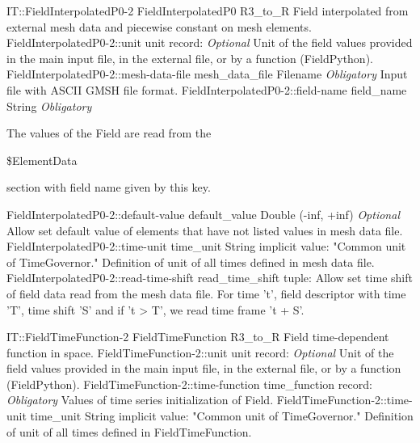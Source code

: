 \begin{RecordType}
	{IT::FieldInterpolatedP0-2}
	{FieldInterpolatedP0}
	{}%
	{}%
	{{{R3{\_}to{\_}R Field interpolated from external mesh data and piecewise constant on mesh elements.}%
}}
		\RecKey
			{FieldInterpolatedP0-2::unit}
			{unit}
			{{record: }}{}
			{ \it{Optional}}
			{{{Unit of the field values provided in the main input file, in the external file, or by a function (FieldPython).}%
}}
		\RecKey
			{FieldInterpolatedP0-2::mesh-data-file}
			{mesh{\_}data{\_}file}
			{{Filename}}{}
			{ \it{Obligatory}}
			{{{Input file with ASCII GMSH file format.}%
}}
		\RecKey
			{FieldInterpolatedP0-2::field-name}
			{field{\_}name}
			{{String}}{}
			{ \it{Obligatory}}
			{{{The values of the Field are read from the }\begin{ttfamily}{\$}ElementData\end{ttfamily}{ section with field name given by this key.}%
}}
		\RecKey
			{FieldInterpolatedP0-2::default-value}
			{default{\_}value}
			{{Double (-inf, +inf)}}{}
			{ \it{Optional}}
			{{{Allow set default value of elements that have not listed values in mesh data file.}%
}}
		\RecKey
			{FieldInterpolatedP0-2::time-unit}
			{time{\_}unit}
			{{String}}{}
			{implicit value: "{Common unit of TimeGovernor.}"}
			{{{Definition of unit of all times defined in mesh data file.}%
}}
		\RecKey
			{FieldInterpolatedP0-2::read-time-shift}
			{read{\_}time{\_}shift}
			{{tuple: }}{}
			{ }
			{{{Allow set time shift of field data read from the mesh data file.
For time 't', field descriptor with time 'T', time shift 'S' and if 't {\textgreater} T', we read time frame 't + S'.}%
}}
\end{RecordType}
\begin{RecordType}
	{IT::FieldTimeFunction-2}
	{FieldTimeFunction}
	{}%
	{}%
	{{{R3{\_}to{\_}R Field time-dependent function in space.}%
}}
		\RecKey
			{FieldTimeFunction-2::unit}
			{unit}
			{{record: }}{}
			{ \it{Optional}}
			{{{Unit of the field values provided in the main input file, in the external file, or by a function (FieldPython).}%
}}
		\RecKey
			{FieldTimeFunction-2::time-function}
			{time{\_}function}
			{{record: }}{}
			{ \it{Obligatory}}
			{{{Values of time series initialization of Field.}%
}}
		\RecKey
			{FieldTimeFunction-2::time-unit}
			{time{\_}unit}
			{{String}}{}
			{implicit value: "{Common unit of TimeGovernor.}"}
			{{{Definition of unit of all times defined in FieldTimeFunction.}%
}}
\end{RecordType}
